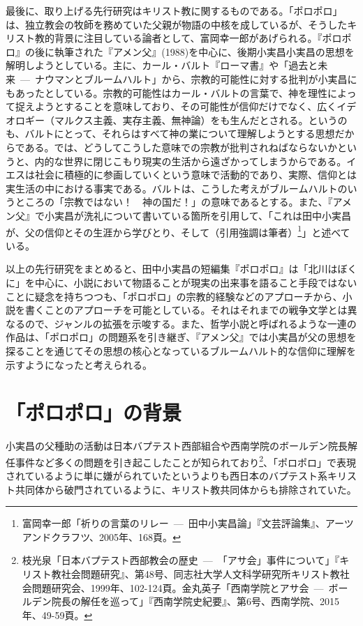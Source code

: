 最後に、取り上げる先行研究はキリスト教に関するものである。「ポロポロ」は、独立教会の牧師を務めていた父親が物語の中核を成しているが、そうしたキリスト教的背景に注目している論者として、富岡幸一郎があげられる。『ポロポロ』の後に執筆された『アメン父』(1988)を中心に、後期小実昌小実昌の思想を解明しようとしている。主に、カール・バルト『ローマ書』や「過去と未来~---~ナウマンとブルームハルト」から、宗教的可能性に対する批判が小実昌にもあったとしている。宗教的可能性はカール・バルトの言葉で、神を理性によって捉えようとすることを意味しており、その可能性が信仰だけでなく、広くイデオロギー（マルクス主義、実存主義、無神論）をも生んだとされる。というのも、バルトにとって、それらはすべて神の業について理解しようとする思想だからである。では、どうしてこうした意味での宗教が批判されねばならないかというと、内的な世界に閉じこもり現実の生活から遠ざかってしまうからである。イエスは社会に積極的に参画していくという意味で活動的であり、実際、信仰とは実生活の中における事実である。バルトは、こうした考えがブルームハルトのいうところの「宗教ではない！　神の国だ！」の意味であるとする。また、『アメン父』で小実昌が洗礼について書いている箇所を引用して、「これは田中小実昌が、父の信仰とその生涯から学びとり、そして（引用強調は筆者）\footnote{富岡幸一郎「祈りの言葉のリレー~---~田中小実昌論」『文芸評論集』、アーツアンドクラフツ、2005年、168頁。}」と述べている。

以上の先行研究をまとめると、田中小実昌の短編集『ポロポロ』は「北川はぼくに」を中心に、小説において物語ることが現実の出来事を語ること手段ではないことに疑念を持ちつつも、「ポロポロ」の宗教的経験などのアプローチから、小説を書くことのアプローチを可能としている。それはそれまでの戦争文学とは異なるので、ジャンルの拡張を示唆する。また、哲学小説と呼ばれるような一連の作品は、「ポロポロ」の問題系を引き継ぎ、『アメン父』では小実昌が父の思想を探ることを通じてその思想の核心となっているブルームハルト的な信仰に理解を示すようになったと考えられる。

\section{「ポロポロ」の背景}

小実昌の父種助の活動は日本バプテスト西部組合や西南学院のボールデン院長解任事件など多くの問題を引き起こしたことが知られており\footnote{枝光泉「日本バプテスト西部教会の歴史~---~「アサ会」事件について」『キリスト教社会問題研究』、第48号、同志社大学人文科学研究所キリスト教社会問題研究会、1999年、102-124頁。金丸英子「西南学院とアサ会~---~ボールデン院長の解任を巡って」『西南学院史紀要』、第6号、西南学院、2015年、49-59頁。}、「ポロポロ」で表現されているように単に嫌がられていたというよりも西日本のバプテスト系キリスト共同体から破門されているように、キリスト教共同体からも排除されていた。


